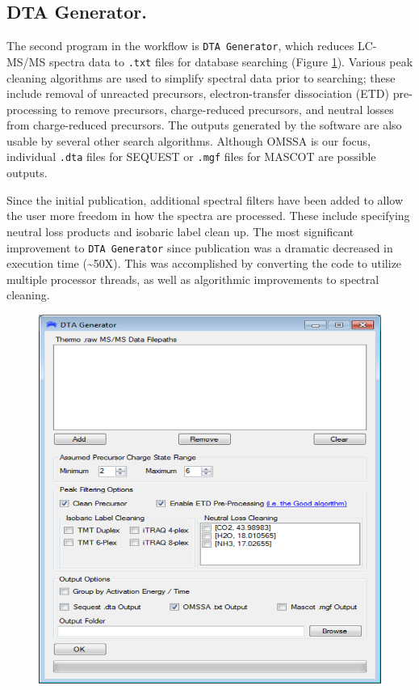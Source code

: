 \subsection*{DTA Generator.}
The second program in the \compass{} workflow is \texttt{DTA Generator}, which reduces LC-MS/MS spectra data to \texttt{.txt} files for database searching (Figure \ref{fig:dtagenerator}). Various peak cleaning algorithms are used to simplify spectral data prior to searching; these include removal of unreacted precursors, electron-transfer dissociation (ETD) pre-processing to remove precursors, charge-reduced precursors, and neutral losses from charge-reduced precursors.\cite{good} The outputs generated by the software are also usable by several other search algorithms. Although OMSSA is our focus, individual \texttt{.dta} files for SEQUEST or \texttt{.mgf} files for MASCOT are possible outputs.\cite{sequest,mascot}

Since the initial publication, additional spectral filters have been added to allow the user more freedom in how the spectra are processed. These include specifying neutral loss products and isobaric label clean up. The most significant improvement to \texttt{DTA Generator} since publication was a dramatic decreased in execution time (\textasciitilde50X). This was accomplished by converting the code to utilize multiple processor threads, as well as algorithmic improvements to spectral cleaning. 
\begin{figure}[p]
	\centering
	\includegraphics[width=0.8\columnwidth]{csmsl/dtagenerator.png}
	\label{fig:dtagenerator}
\end{figure}

